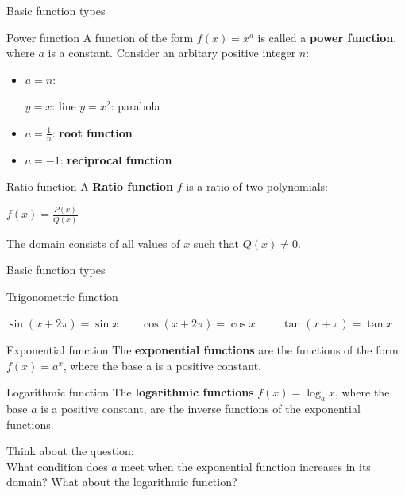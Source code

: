 \documentclass{beamer}
\begin{document}
\begin{frame}{Basic function types}
    \begin{block}{Power function}
        A function of the form $f(x)=x^a$ is called a \textbf{power function}, where $a$ is a constant. Consider an arbitary positive integer $n$:
        \begin{itemize}
            \item $a=n$:\\
                \begin{center}
                    $y=x$: line \qquad $y=x^2$: parabola
                \end{center}
            \item $a=\frac{1}{n}$: \textbf{root function}\\
            \item $a=-1$: \textbf{reciprocal function}
        \end{itemize}
    \end{block}
    \begin{block}{Ratio function}
        A \textbf{Ratio function} $f$ is a ratio of two polynomials:
        \begin{center}
            $f(x)=\frac{P(x)}{Q(x)}$
        \end{center}
        The domain consists of all values of $x$ such that $Q(x)\neq 0$.
    \end{block}
\end{frame}

\begin{frame}{Basic function types}
    \begin{block}{Trigonometric function}
        \begin{center}
            $\sin (x+2\pi)=\sin x\qquad \cos (x+2\pi)=\cos x\qquad $
            $\tan (x+\pi)=\tan x$
        \end{center}
    \end{block}
    \begin{block}{Exponential function}
        The \textbf{exponential functions} are the functions of the form $f(x) = a^x$, where the base a is a positive constant.
    \end{block}
    \begin{block}{Logarithmic function}
        The \textbf{logarithmic functions} $f(x) = \log_ax$, where the base $a$ is a positive constant, are the inverse functions of the exponential functions. 
    \end{block}
    Think about the question:\\
    What condition does $a$ meet when the exponential function increases in its domain? What about the logarithmic function?
\end{frame}
\end{document}
